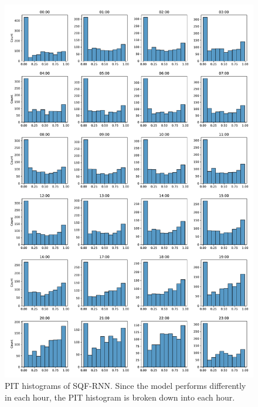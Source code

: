 \begin{figure}[h]%
    \centering
    \includegraphics[width=\textwidth]{plots/pit/pit_by_hour_sqf-rnn.pdf}
    \caption[PIT histograms SQF-RNN]{PIT histograms of SQF-RNN. Since the model performs differently 
    in each hour, the PIT histogram is broken down into each hour.}%
    \label{fig:pit-sqf-rnn-by-hour}%
\end{figure}